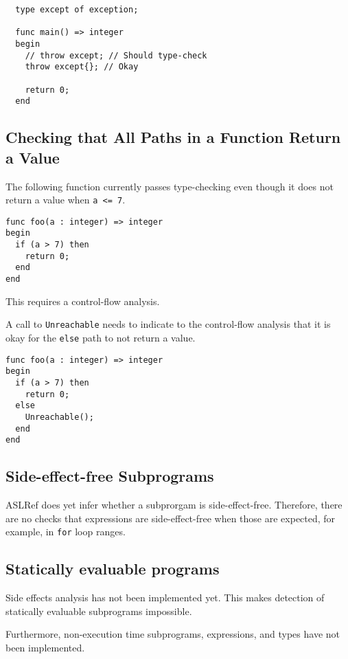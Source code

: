 \documentclass{book}
\begin{document}
\begin{verbatim}
  type except of exception;

  func main() => integer
  begin
    // throw except; // Should type-check
    throw except{}; // Okay

    return 0;
  end
\end{verbatim}

\subsection{Checking that All Paths in a Function Return a Value}
The following function currently passes type-checking even though
it does not return a value when \texttt{a <= 7}.
\begin{verbatim}
func foo(a : integer) => integer
begin
  if (a > 7) then
    return 0;
  end
end
\end{verbatim}
This requires a control-flow analysis.

A call to \texttt{Unreachable} needs to indicate to the control-flow
analysis that it is okay for the \texttt{else} path to not return a value.
\begin{verbatim}
func foo(a : integer) => integer
begin
  if (a > 7) then
    return 0;
  else
    Unreachable();
  end
end
\end{verbatim}

\subsection{Side-effect-free Subprograms}
ASLRef does yet infer whether a subprorgam is side-effect-free.
Therefore, there are no checks that expressions are side-effect-free when those are expected,
for example, in \texttt{for} loop ranges.


\subsection{Statically evaluable programs}%
\label{sec:nyi:statically-evaluable-subprograms}

Side effects analysis has not been implemented yet.
%
This makes detection of statically evaluable subprograms impossible.

Furthermore, non-execution time subprograms, expressions, and types have not
been implemented.

\end{document}
